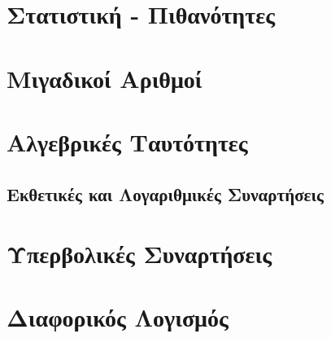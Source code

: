 



\everymath{\displaystyle}





\chapter{Στατιστική - Πιθανότητες}














\chapter{Μιγαδικοί Αριθμοί}



\chapter{Αλγεβρικές Ταυτότητες}





\section{Εκθετικές και Λογαριθμικές Συναρτήσεις}



\chapter{Υπερβολικές Συναρτήσεις}



\chapter{Διαφορικός Λογισμός}






